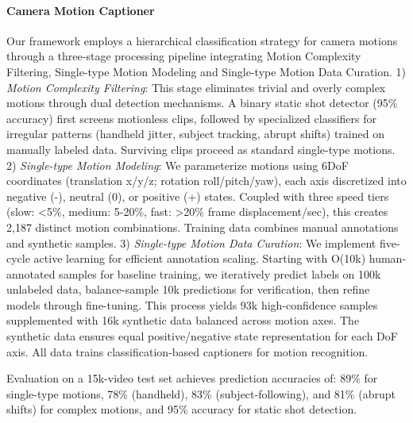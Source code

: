 \documentclass{article}
\begin{document}
{%
\paragraph{Camera Motion Captioner} Our framework employs a hierarchical classification strategy for camera motions through a three-stage processing pipeline integrating Motion Complexity Filtering, Single-type Motion Modeling and Single-type Motion Data Curation. 1) \emph{Motion Complexity Filtering}: This stage eliminates trivial and overly complex motions through dual detection mechanisms. A binary static shot detector (95\% accuracy) first screens motionless clips, followed by specialized classifiers for irregular patterns (handheld jitter, subject tracking, abrupt shifts) trained on manually labeled data. Surviving clips proceed as standard single-type motions. 2) \emph{Single-type Motion Modeling}: We parameterize motions using 6DoF coordinates (translation x/y/z; rotation roll/pitch/yaw), each axis discretized into negative (-), neutral (0), or positive (+) states. Coupled with three speed tiers (slow: <5\%, medium: 5-20\%, fast: >20\% frame displacement/sec), this creates 2,187 distinct motion combinations. Training data combines manual annotations and synthetic samples. 3) \emph{Single-type Motion Data Curation}: We implement five-cycle active learning for efficient annotation scaling. Starting with O(10k) human-annotated samples for baseline training, we iteratively predict labels on 100k unlabeled data, balance-sample 10k predictions for verification, then refine models through fine-tuning. This process yields 93k high-confidence samples supplemented with 16k synthetic data balanced across motion axes. The synthetic data ensures equal positive/negative state representation for each DoF axis. All data trains classification-based captioners for motion recognition.

Evaluation on a 15k-video test set achieves prediction accuracies of: 89\% for single-type motions, 78\% (handheld), 83\% (subject-following), and 81\% (abrupt shifts) for complex motions, and 95\% accuracy for static shot detection.

}
\end{document}
